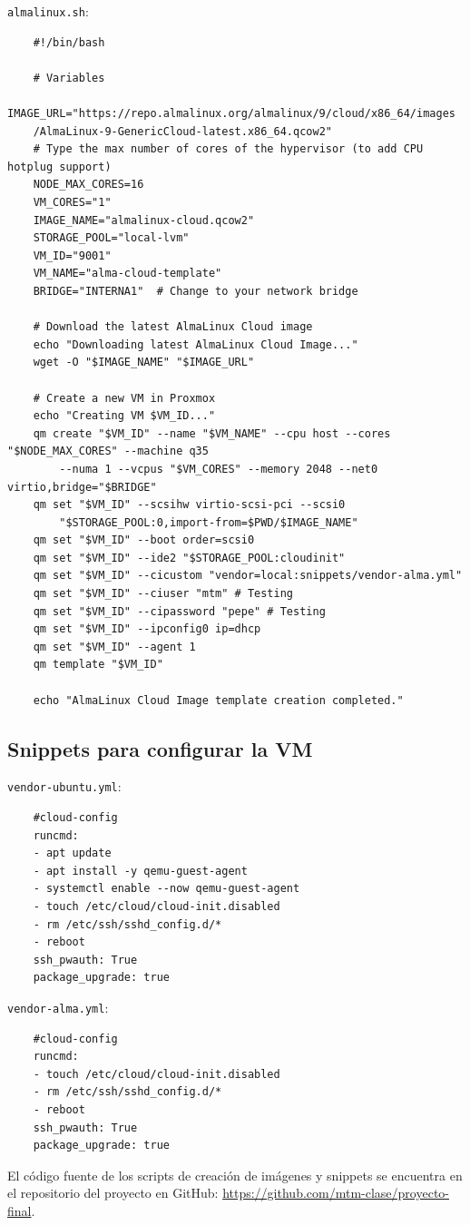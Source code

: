 \documentclass[11pt,oneside,a4paper]{book}
\newcommand{\newsection}[1]{{\subsection*{#1}
\addcontentsline{toc}{section}{#1}}}
\begin{document}
\newpage

\texttt{almalinux.sh}:
\begin{verbatim}
    #!/bin/bash

    # Variables
    IMAGE_URL="https://repo.almalinux.org/almalinux/9/cloud/x86_64/images
    /AlmaLinux-9-GenericCloud-latest.x86_64.qcow2"
    # Type the max number of cores of the hypervisor (to add CPU hotplug support)
    NODE_MAX_CORES=16
    VM_CORES="1"
    IMAGE_NAME="almalinux-cloud.qcow2"
    STORAGE_POOL="local-lvm"
    VM_ID="9001"
    VM_NAME="alma-cloud-template"
    BRIDGE="INTERNA1"  # Change to your network bridge

    # Download the latest AlmaLinux Cloud image
    echo "Downloading latest AlmaLinux Cloud Image..."
    wget -O "$IMAGE_NAME" "$IMAGE_URL"

    # Create a new VM in Proxmox
    echo "Creating VM $VM_ID..."
    qm create "$VM_ID" --name "$VM_NAME" --cpu host --cores "$NODE_MAX_CORES" --machine q35 
        --numa 1 --vcpus "$VM_CORES" --memory 2048 --net0 virtio,bridge="$BRIDGE"
    qm set "$VM_ID" --scsihw virtio-scsi-pci --scsi0 
        "$STORAGE_POOL:0,import-from=$PWD/$IMAGE_NAME"
    qm set "$VM_ID" --boot order=scsi0
    qm set "$VM_ID" --ide2 "$STORAGE_POOL:cloudinit"
    qm set "$VM_ID" --cicustom "vendor=local:snippets/vendor-alma.yml"
    qm set "$VM_ID" --ciuser "mtm" # Testing
    qm set "$VM_ID" --cipassword "pepe" # Testing
    qm set "$VM_ID" --ipconfig0 ip=dhcp
    qm set "$VM_ID" --agent 1
    qm template "$VM_ID"

    echo "AlmaLinux Cloud Image template creation completed."
\end{verbatim}

\newpage


\newsection{Snippets para configurar la VM}
\texttt{vendor-ubuntu.yml}:
\begin{verbatim}
    #cloud-config
    runcmd:
    - apt update
    - apt install -y qemu-guest-agent
    - systemctl enable --now qemu-guest-agent
    - touch /etc/cloud/cloud-init.disabled
    - rm /etc/ssh/sshd_config.d/*
    - reboot
    ssh_pwauth: True
    package_upgrade: true
\end{verbatim}
\texttt{vendor-alma.yml}:
\begin{verbatim}
    #cloud-config
    runcmd:
    - touch /etc/cloud/cloud-init.disabled
    - rm /etc/ssh/sshd_config.d/*
    - reboot
    ssh_pwauth: True
    package_upgrade: true
\end{verbatim}

\newpage
El código fuente de los scripts de creación de imágenes y snippets se encuentra en el repositorio del proyecto en GitHub: \url{https://github.com/mtm-clase/proyecto-final}.
\end{document}
